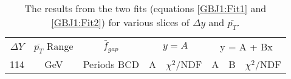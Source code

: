 \begin{table}
\footnotesize 
\centering
\begin{tabular}{ | c | c | c | c | c | c | c | c | }
\hline
\hline
$\Delta Y$ & $\overline{p_{T}}$ Range & $\bar{f}_{gap}$&\multicolumn{2}{|c|}{$y = A$} & \multicolumn{3}{|c|}{y = A + Bx}\\
114   & GeV& Periods BCD &A&$\chi^{2}$/NDF&A&B&$\chi^{2}$/NDF\\
\hline

\hline
\hline
\end{tabular}
\caption[Results from period dependant and period independent straight line fits to the average gap fraction as a function of period]{
The results from the two fits (equations \ref{GBJ1:Fit1} and \ref{GBJ1:Fit2}) for various slices of $\Delta y$ and $\bar{p_T}$.
\label{GBJ1:GFAveTable}}
\end{table}

